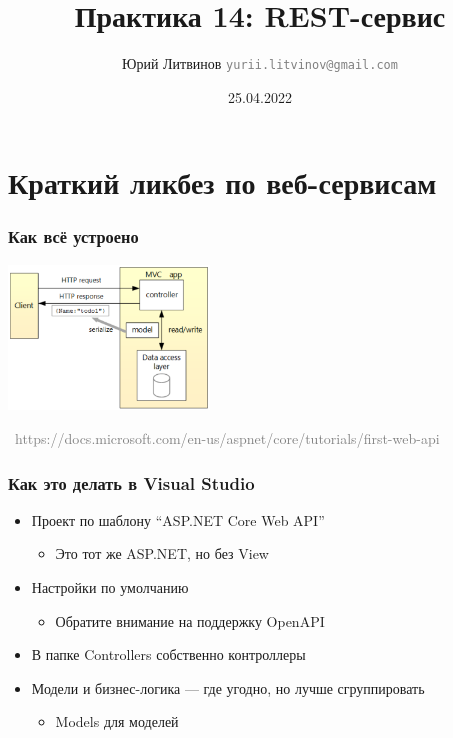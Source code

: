 \documentclass[xetex,mathserif,serif]{beamer}
\title{Практика 14: REST-сервис}
\author[Юрий Литвинов]{Юрий Литвинов \newline \textcolor{gray}{\small\texttt{yurii.litvinov@gmail.com}}}
\date{25.04.2022}
\newcommand{\attribution}[1] {
    \vspace{-5mm}\begin{flushright}\begin{scriptsize}\textcolor{gray}{\textcopyright\, #1}\end{scriptsize}\end{flushright}
}
\begin{document}
    \frame{\titlepage}

    \section{Краткий ликбез по веб-сервисам}

    \begin{frame}
        \frametitle{Как всё устроено}
        \begin{center}
            \includegraphics[width=0.4\textwidth]{webApiServiceDesign.png}
            \attribution{https://docs.microsoft.com/en-us/aspnet/core/tutorials/first-web-api}
        \end{center}
    \end{frame}

    \begin{frame}
        \frametitle{Как это делать в Visual Studio}
        \begin{itemize}
            \item Проект по шаблону ``ASP.NET Core Web API''
            \begin{itemize}
                \item Это тот же ASP.NET, но без View
            \end{itemize}
            \item Настройки по умолчанию
            \begin{itemize}
                \item Обратите внимание на поддержку OpenAPI
            \end{itemize}
            \item В папке Controllers собственно контроллеры
            \item Модели и бизнес-логика --- где угодно, но лучше сгруппировать
            \begin{itemize}
                \item Models для моделей
            \end{itemize}
        \end{itemize}
    \end{frame}
\end{document}
